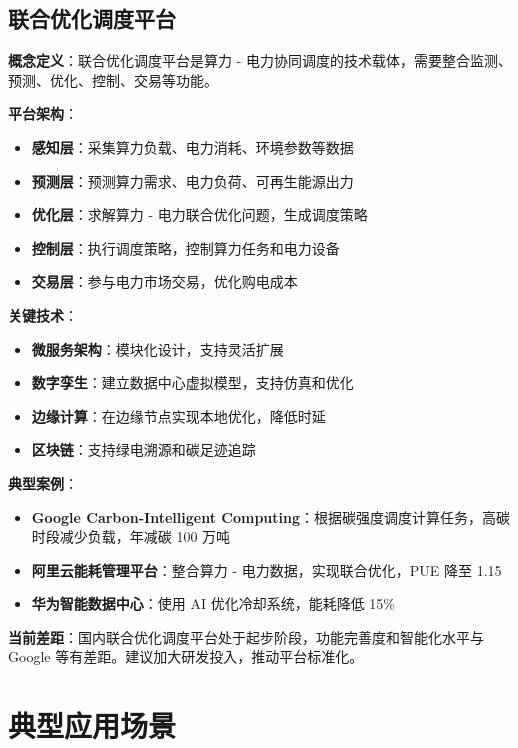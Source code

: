 \documentclass[12pt,a4paper]{article}
\begin{document}
\subsection{联合优化调度平台}

\textbf{概念定义}：联合优化调度平台是算力 - 电力协同调度的技术载体，需要整合监测、预测、优化、控制、交易等功能\cite{dong2022east}。

\textbf{平台架构}：
\begin{itemize}
    \item \textbf{感知层}：采集算力负载、电力消耗、环境参数等数据
    \item \textbf{预测层}：预测算力需求、电力负荷、可再生能源出力
    \item \textbf{优化层}：求解算力 - 电力联合优化问题，生成调度策略
    \item \textbf{控制层}：执行调度策略，控制算力任务和电力设备
    \item \textbf{交易层}：参与电力市场交易，优化购电成本
\end{itemize}

\textbf{关键技术}：
\begin{itemize}
    \item \textbf{微服务架构}：模块化设计，支持灵活扩展
    \item \textbf{数字孪生}：建立数据中心虚拟模型，支持仿真和优化
    \item \textbf{边缘计算}：在边缘节点实现本地优化，降低时延
    \item \textbf{区块链}：支持绿电溯源和碳足迹追踪
\end{itemize}

\textbf{典型案例}：
\begin{itemize}
    \item \textbf{Google Carbon-Intelligent Computing}：根据碳强度调度计算任务，高碳时段减少负载，年减碳 100 万吨
    \item \textbf{阿里云能耗管理平台}：整合算力 - 电力数据，实现联合优化，PUE 降至 1.15
    \item \textbf{华为智能数据中心}：使用 AI 优化冷却系统，能耗降低 15\%
\end{itemize}

\textbf{当前差距}：国内联合优化调度平台处于起步阶段，功能完善度和智能化水平与 Google 等有差距。建议加大研发投入，推动平台标准化。

\section{典型应用场景}
\label{sec:scenarios}
\end{document}
